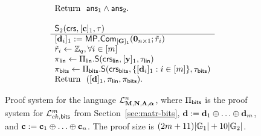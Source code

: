 \begin{figure}
\begin{\algSize}
$$\begin{array}{l}
\begin{array}{l}
\text{Return } \ \mathsf{ans}_1\wedge\mathsf{ans}_2.
\\
\\
\end{array}
\\
\begin{array}{l}
{\mathsf{S}_2(\mathsf{crs},[\mathbf{c}]_1,\tau)}\\
\hline
{[\mathbf{d}_i]_1} := \mathsf{MP}.\mathsf{Com}_{[\mathbf{{G}}]_1}(\mathbf{{0}}_{n\times 1};\tilde{{r}}_i)\\
\tilde{{r}}_i\gets\mathbb{Z}_q, \forall i\in[{m}]\\
\pi_{\mathsf{lin}} \gets 
    \Pi_{\mathsf{lin}}.\mathsf{S}
    (
        \mathsf{crs}_{\mathsf{lin}},
            [\mathbf{y}]_1,
       \tau_{\mathsf{lin}}
    )\\
\pi_{\mathsf{bits}} \gets
    \Pi_{\mathsf{bits}}.\mathsf{S}
    (
        \mathsf{crs}_{\mathsf{bits}},\{[\mathbf{d}_i]_1:i\in[{m}]\},
        \tau_{\mathsf{bits}}
    )\\
\text{Return } \  ([\mathbf{d}]_1,\pi_{\mathsf{lin}},\pi_{\mathsf{bits}}). \\
\end{array}
\end{array}$$
\end{\algSize}
\caption{Proof system for the language $\mathcal{L}_{\mathbf{{M}},\mathbf{{N}},\mathbf{{\Lambda}},{\boldsymbol \alpha}}^n$, where $\Pi_{\mathsf{bits}}$ is the proof system for $\mathcal{L}_{ck,\mathsf{bits}}^m$ from Section~\ref{sec:matr-bits}, $\mathbf{d}:=\mathbf{d}_1\oplus\ldots\oplus\mathbf{d}_{m}$, and $\mathbf{c}:=\mathbf{c}_1\oplus\ldots\oplus\mathbf{c}_n$. The proof size is $(2{m}+11)|\mathbb{G}_1|+10|\mathbb{G}_2|$.\label{fig:bin-leng-nizk}}
\end{figure}

